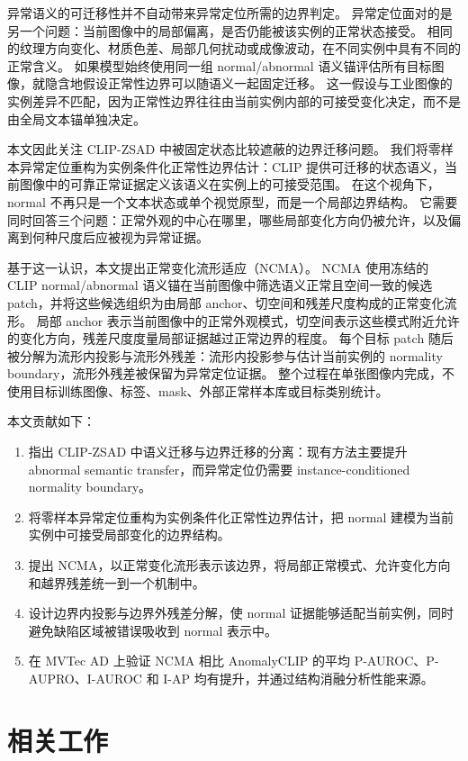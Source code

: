 \documentclass[UTF8,11pt,a4paper,fontset=none]{ctexart}
\newcommand{\method}{NCMA}
\newcommand{\clip}{CLIP}
\begin{document}
异常语义的可迁移性并不自动带来异常定位所需的边界判定。
异常定位面对的是另一个问题：当前图像中的局部偏离，是否仍能被该实例的正常状态接受。
相同的纹理方向变化、材质色差、局部几何扰动或成像波动，在不同实例中具有不同的正常含义。
如果模型始终使用同一组 normal/abnormal 语义锚评估所有目标图像，就隐含地假设正常性边界可以随语义一起固定迁移。
这一假设与工业图像的实例差异不匹配，因为正常性边界往往由当前实例内部的可接受变化决定，而不是由全局文本锚单独决定。

本文因此关注 CLIP-ZSAD 中被固定状态比较遮蔽的边界迁移问题。
我们将零样本异常定位重构为实例条件化正常性边界估计：CLIP 提供可迁移的状态语义，当前图像中的可靠正常证据定义该语义在实例上的可接受范围。
在这个视角下，normal 不再只是一个文本状态或单个视觉原型，而是一个局部边界结构。
它需要同时回答三个问题：正常外观的中心在哪里，哪些局部变化方向仍被允许，以及偏离到何种尺度后应被视为异常证据。

基于这一认识，本文提出正常变化流形适应（\method{}）。
\method{} 使用冻结的 \clip{} normal/abnormal 语义锚在当前图像中筛选语义正常且空间一致的候选 patch，并将这些候选组织为由局部 anchor、切空间和残差尺度构成的正常变化流形。
局部 anchor 表示当前图像中的正常外观模式，切空间表示这些模式附近允许的变化方向，残差尺度度量局部证据越过正常边界的程度。
每个目标 patch 随后被分解为流形内投影与流形外残差：流形内投影参与估计当前实例的 normality boundary，流形外残差被保留为异常定位证据。
整个过程在单张图像内完成，不使用目标训练图像、标签、mask、外部正常样本库或目标类别统计。

本文贡献如下：
\begin{enumerate}
  \item 指出 CLIP-ZSAD 中语义迁移与边界迁移的分离：现有方法主要提升 abnormal semantic transfer，而异常定位仍需要 instance-conditioned normality boundary。
  \item 将零样本异常定位重构为实例条件化正常性边界估计，把 normal 建模为当前实例中可接受局部变化的边界结构。
  \item 提出 \method{}，以正常变化流形表示该边界，将局部正常模式、允许变化方向和越界残差统一到一个机制中。
  \item 设计边界内投影与边界外残差分解，使 normal 证据能够适配当前实例，同时避免缺陷区域被错误吸收到 normal 表示中。
  \item 在 MVTec AD 上验证 \method{} 相比 AnomalyCLIP 的平均 P-AUROC、P-AUPRO、I-AUROC 和 I-AP 均有提升，并通过结构消融分析性能来源。
\end{enumerate}

\section{相关工作}
\label{sec:related_work}
\end{document}
